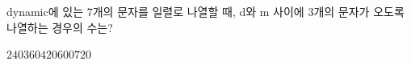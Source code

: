 \hspace*{2mm}\begin{minipage}[t]{\dimexpr\linewidth-2mm\relax}\vspace{0pt}
dynamic에 있는 $7$개의 문자를 일렬로 나열할 때, d와 m 사이에 $3$개의 문자가 오도록 나열하는 경우의 수는?
\begin{choices32}{$240$}{$360$}{$420$}{$600$}{$720$}\end{choices32}\end{minipage}
